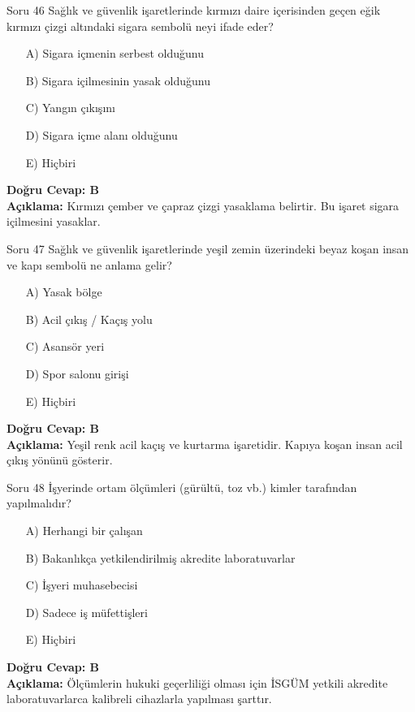 \documentclass[12pt,a4paper]{article}
\begin{document}
\begin{testcard}{Soru 46}
    Sağlık ve güvenlik işaretlerinde kırmızı daire içerisinden geçen eğik kırmızı çizgi altındaki sigara sembolü neyi ifade eder?
    \begin{itemize}
        \item[A)] Sigara içmenin serbest olduğunu
        \item[B)] Sigara içilmesinin yasak olduğunu
        \item[C)] Yangın çıkışını
        \item[D)] Sigara içme alanı olduğunu
        \item[E)] Hiçbiri
    \end{itemize}
    \tcblower
    \textbf{Doğru Cevap: B} \\
    \textbf{Açıklama:} Kırmızı çember ve çapraz çizgi yasaklama belirtir. Bu işaret sigara içilmesini yasaklar.
\end{testcard}

\begin{testcard}{Soru 47}
    Sağlık ve güvenlik işaretlerinde yeşil zemin üzerindeki beyaz koşan insan ve kapı sembolü ne anlama gelir?
    \begin{itemize}
        \item[A)] Yasak bölge
        \item[B)] Acil çıkış / Kaçış yolu
        \item[C)] Asansör yeri
        \item[D)] Spor salonu girişi
        \item[E)] Hiçbiri
    \end{itemize}
    \tcblower
    \textbf{Doğru Cevap: B} \\
    \textbf{Açıklama:} Yeşil renk acil kaçış ve kurtarma işaretidir. Kapıya koşan insan acil çıkış yönünü gösterir.
\end{testcard}

\begin{testcard}{Soru 48}
    İşyerinde ortam ölçümleri (gürültü, toz vb.) kimler tarafından yapılmalıdır?
    \begin{itemize}
        \item[A)] Herhangi bir çalışan
        \item[B)] Bakanlıkça yetkilendirilmiş akredite laboratuvarlar
        \item[C)] İşyeri muhasebecisi
        \item[D)] Sadece iş müfettişleri
        \item[E)] Hiçbiri
    \end{itemize}
    \tcblower
    \textbf{Doğru Cevap: B} \\
    \textbf{Açıklama:} Ölçümlerin hukuki geçerliliği olması için İSGÜM yetkili akredite laboratuvarlarca kalibreli cihazlarla yapılması şarttır.
\end{testcard}
\end{document}
